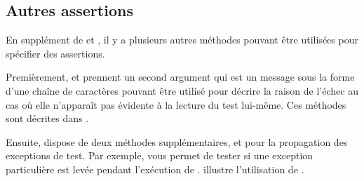 \documentclass[a4paper,10pt,twoside]{book}
\begin{document}
\subsection{Autres assertions}
En supplément de  et , il y a plusieurs autres méthodes pouvant être utilisées pour spécifier des assertions. 


Premièrement,  et  prennent un second argument qui est un message sous la forme d'une chaîne de caractères pouvant être utilisé pour décrire la raison de l'échec au cas où elle n'apparaît pas évidente à la lecture du test lui-même. Ces méthodes sont décrites dans .


Ensuite, \sunit dispose de deux méthodes supplémentaires,  et   pour la propagation des exceptions de test. Par exemple,  vous permet de tester si une exception particulière est levée pendant l'exécution de .  illustre l'utilisation de \mbox{}.

\end{document}

